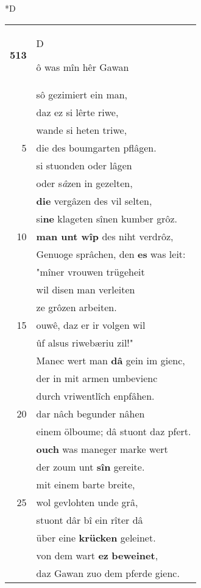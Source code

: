 \documentclass[8pt,a4paper,notitlepage]{article}
\begin{document}
\begin{table}[ht]
\begin{minipage}[t]{0.5\linewidth}
\small
\begin{center}*D
\end{center}
\begin{tabular}{rl}
\textbf{513} & \begin{large}D\end{large}ô was mîn hêr Gawan\\ 
 & sô gezimiert ein man,\\ 
 & daz ez si lêrte riwe,\\ 
 & wande si heten triwe,\\ 
5 & die des boumgarten pflâgen.\\ 
 & si stuonden oder lâgen\\ 
 & oder s\textit{â}zen in gezelten,\\ 
 & \textbf{die} vergâzen des vil selten,\\ 
 & si\textbf{ne} klageten sînen kumber grôz.\\ 
10 & \textbf{man unt wîp} des niht verdrôz,\\ 
 & Genuoge sprâchen, den \textbf{es} was leit:\\ 
 & "mîner vrouwen trügeheit\\ 
 & wil disen man verleiten\\ 
 & ze grôzen arbeiten.\\ 
15 & ouwê, daz er ir volgen wil\\ 
 & ûf alsus riwebæriu zil!"\\ 
 & Manec wert man \textbf{dâ} gein im gienc,\\ 
 & der in mit armen umbevienc\\ 
 & durch vriwentlîch enpfâhen.\\ 
20 & dar nâch begunder nâhen\\ 
 & einem ölboume; dâ stuont daz pfert.\\ 
 & \textbf{ouch} was maneger marke wert\\ 
 & der zoum unt \textbf{sîn} gereite.\\ 
 & mit einem barte breite,\\ 
25 & wol gevlohten unde grâ,\\ 
 & stuont dâr bî ein rîter dâ\\ 
 & über eine \textbf{krücken} geleinet.\\ 
 & von dem wart \textbf{ez} \textbf{beweinet},\\ 
 & daz Gawan zuo dem pferde gienc.\\ 

\end{tabular}
\end{minipage}
\end{table}
\end{document}
